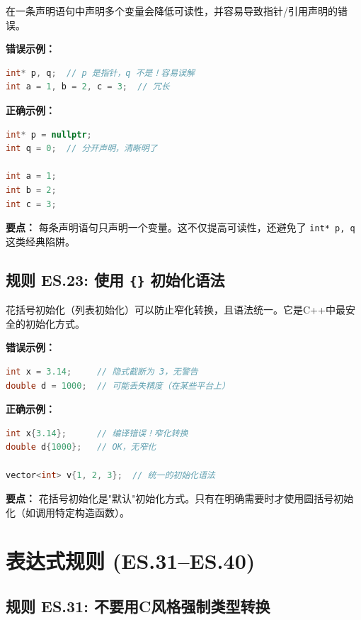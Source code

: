 在一条声明语句中声明多个变量会降低可读性，并容易导致指针/引用声明的错误。

\textbf{错误示例：}

\begin{lstlisting}[language=C++]
int* p, q;  // p 是指针，q 不是！容易误解
int a = 1, b = 2, c = 3;  // 冗长
\end{lstlisting}

\textbf{正确示例：}

\begin{lstlisting}[language=C++]
int* p = nullptr;
int q = 0;  // 分开声明，清晰明了

int a = 1;
int b = 2;
int c = 3;
\end{lstlisting}

\textbf{要点：} 每条声明语句只声明一个变量。这不仅提高可读性，还避免了 \texttt{int* p, q} 这类经典陷阱。

\subsection*{\textbf{规则 ES.23:} 使用 \texttt{\{\}} 初始化语法}

花括号初始化（列表初始化）可以防止窄化转换，且语法统一。它是C++中最安全的初始化方式。

\textbf{错误示例：}

\begin{lstlisting}[language=C++]
int x = 3.14;     // 隐式截断为 3，无警告
double d = 1000;  // 可能丢失精度（在某些平台上）
\end{lstlisting}

\textbf{正确示例：}

\begin{lstlisting}[language=C++]
int x{3.14};      // 编译错误！窄化转换
double d{1000};   // OK，无窄化

vector<int> v{1, 2, 3};  // 统一的初始化语法
\end{lstlisting}

\textbf{要点：} 花括号初始化是"默认"初始化方式。只有在明确需要时才使用圆括号初始化（如调用特定构造函数）。

\section{表达式规则 (ES.31--ES.40)}

\subsection*{\textbf{规则 ES.31:} 不要用C风格强制类型转换}

